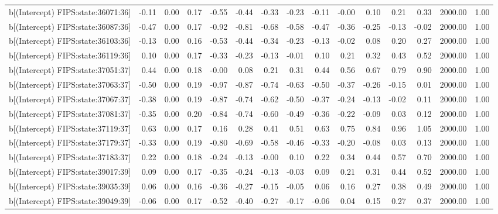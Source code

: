 \begin{table}[ht]
\begin{tabular}{rrrrrrrrrrrrrrr}
  b[(Intercept) FIPS:state:36071:36] & -0.11 & 0.00 & 0.17 & -0.55 & -0.44 & -0.33 & -0.23 & -0.11 & -0.00 & 0.10 & 0.21 & 0.33 & 2000.00 & 1.00 \\ 
  b[(Intercept) FIPS:state:36087:36] & -0.47 & 0.00 & 0.17 & -0.92 & -0.81 & -0.68 & -0.58 & -0.47 & -0.36 & -0.25 & -0.13 & -0.02 & 2000.00 & 1.00 \\ 
  b[(Intercept) FIPS:state:36103:36] & -0.13 & 0.00 & 0.16 & -0.53 & -0.44 & -0.34 & -0.23 & -0.13 & -0.02 & 0.08 & 0.20 & 0.27 & 2000.00 & 1.00 \\ 
  b[(Intercept) FIPS:state:36119:36] & 0.10 & 0.00 & 0.17 & -0.33 & -0.23 & -0.13 & -0.01 & 0.10 & 0.21 & 0.32 & 0.43 & 0.52 & 2000.00 & 1.00 \\ 
  b[(Intercept) FIPS:state:37051:37] & 0.44 & 0.00 & 0.18 & -0.00 & 0.08 & 0.21 & 0.31 & 0.44 & 0.56 & 0.67 & 0.79 & 0.90 & 2000.00 & 1.00 \\ 
  b[(Intercept) FIPS:state:37063:37] & -0.50 & 0.00 & 0.19 & -0.97 & -0.87 & -0.74 & -0.63 & -0.50 & -0.37 & -0.26 & -0.15 & 0.01 & 2000.00 & 1.00 \\ 
  b[(Intercept) FIPS:state:37067:37] & -0.38 & 0.00 & 0.19 & -0.87 & -0.74 & -0.62 & -0.50 & -0.37 & -0.24 & -0.13 & -0.02 & 0.11 & 2000.00 & 1.00 \\ 
  b[(Intercept) FIPS:state:37081:37] & -0.35 & 0.00 & 0.20 & -0.84 & -0.74 & -0.60 & -0.49 & -0.36 & -0.22 & -0.09 & 0.03 & 0.12 & 2000.00 & 1.00 \\ 
  b[(Intercept) FIPS:state:37119:37] & 0.63 & 0.00 & 0.17 & 0.16 & 0.28 & 0.41 & 0.51 & 0.63 & 0.75 & 0.84 & 0.96 & 1.05 & 2000.00 & 1.00 \\ 
  b[(Intercept) FIPS:state:37179:37] & -0.33 & 0.00 & 0.19 & -0.80 & -0.69 & -0.58 & -0.46 & -0.33 & -0.20 & -0.08 & 0.03 & 0.13 & 2000.00 & 1.00 \\ 
  b[(Intercept) FIPS:state:37183:37] & 0.22 & 0.00 & 0.18 & -0.24 & -0.13 & -0.00 & 0.10 & 0.22 & 0.34 & 0.44 & 0.57 & 0.70 & 2000.00 & 1.00 \\ 
  b[(Intercept) FIPS:state:39017:39] & 0.09 & 0.00 & 0.17 & -0.35 & -0.24 & -0.13 & -0.03 & 0.09 & 0.21 & 0.31 & 0.44 & 0.52 & 2000.00 & 1.00 \\ 
  b[(Intercept) FIPS:state:39035:39] & 0.06 & 0.00 & 0.16 & -0.36 & -0.27 & -0.15 & -0.05 & 0.06 & 0.16 & 0.27 & 0.38 & 0.49 & 2000.00 & 1.00 \\ 
  b[(Intercept) FIPS:state:39049:39] & -0.06 & 0.00 & 0.17 & -0.52 & -0.40 & -0.27 & -0.17 & -0.06 & 0.04 & 0.15 & 0.27 & 0.37 & 2000.00 & 1.00 \\ 

\end{tabular}
\end{table}
